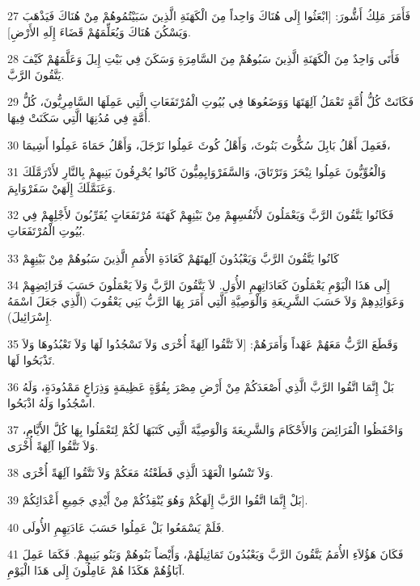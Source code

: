 \par 27 فَأَمَرَ مَلِكُ أَشُّورَ: [ابْعَثُوا إِلَى هُنَاكَ وَاحِداً مِنَ الْكَهَنَةِ الَّذِينَ سَبَيْتُمُوهُمْ مِنْ هُنَاكَ فَيَذْهَبَ وَيَسْكُنَ هُنَاكَ وَيُعَلِّمَهُمْ قَضَاءَ إِلَهِ الأَرْضِ].
\par 28 فَأَتَى وَاحِدٌ مِنَ الْكَهَنَةِ الَّذِينَ سَبُوهُمْ مِنَ السَّامِرَةِ وَسَكَنَ فِي بَيْتِ إِيلَ وَعَلَّمَهُمْ كَيْفَ يَتَّقُونَ الرَّبَّ.
\par 29 فَكَانَتْ كُلُّ أُمَّةٍ تَعْمَلُ آلِهَتَهَا وَوَضَعُوهَا فِي بُيُوتِ الْمُرْتَفَعَاتِ الَّتِي عَمِلَهَا السَّامِرِيُّونَ، كُلُّ أُمَّةٍ فِي مُدُنِهَا الَّتِي سَكَنَتْ فِيهَا.
\par 30 فَعَمِلَ أَهْلُ بَابِلَ سُكُّوتَ بَنُوثَ، وَأَهْلُ كُوثَ عَمِلُوا نَرْجَلَ، وَأَهْلُ حَمَاةَ عَمِلُوا أَشِيمَا،
\par 31 وَالْعُوِّيُّونَ عَمِلُوا نِبْحَزَ وَتَرْتَاقَ، وَالسَّفَرْوَايِمِيُّونَ كَانُوا يُحْرِقُونَ بَنِيهِمْ بِالنَّارِ لأَدْرَمَّلَكَ وَعَنَمَّلَكَ إِلَهَيْ سَفَرْوَايِمَ.
\par 32 فَكَانُوا يَتَّقُونَ الرَّبَّ وَيَعْمَلُونَ لأَنْفُسِهِمْ مِنْ بَيْنِهِمْ كَهَنَةَ مُرْتَفَعَاتٍ يُقَرِّبُونَ لأَجْلِهِمْ فِي بُيُوتِ الْمُرْتَفَعَاتِ.
\par 33 كَانُوا يَتَّقُونَ الرَّبَّ وَيَعْبُدُونَ آلِهتَهُمْ كَعَادَةِ الأُمَمِ الَّذِينَ سَبُوهُمْ مِنْ بَيْنِهِمْ
\par 34 إِلَى هَذَا الْيَوْمِ يَعْمَلُونَ كَعَادَاتِهِمِ الأُوَلِ. لاَ يَتَّقُونَ الرَّبَّ وَلاَ يَعْمَلُونَ حَسَبَ فَرَائِضِهِمْ وَعَوَائِدِهِمْ وَلاَ حَسَبَ الشَّرِيعَةِ وَالْوَصِيَّةِ الَّتِي أَمَرَ بِهَا الرَّبُّ بَنِي يَعْقُوبَ (الَّذِي جَعَلَ اسْمَهُ إِسْرَائِيلَ).
\par 35 وَقَطَعَ الرَّبُّ مَعَهُمْ عَهْداً وَأَمَرَهُمْ: [لاَ تَتَّقُوا آلِهَةً أُخْرَى وَلاَ تَسْجُدُوا لَهَا وَلاَ تَعْبُدُوهَا وَلاَ تَذْبَحُوا لَهَا.
\par 36 بَلْ إِنَّمَا اتَّقُوا الرَّبَّ الَّذِي أَصْعَدَكُمْ مِنْ أَرْضِ مِصْرَ بِقُوَّةٍ عَظِيمَةٍ وَذِرَاعٍ مَمْدُودَةٍ، وَلَهُ اسْجُدُوا وَلَهُ اذْبَحُوا.
\par 37 وَاحْفَظُوا الْفَرَائِضَ وَالأَحْكَامَ وَالشَّرِيعَةَ وَالْوَصِيَّةَ الَّتِي كَتَبَهَا لَكُمْ لِتَعْمَلُوا بِهَا كُلَّ الأَيَّامِ، وَلاَ تَتَّقُوا آلِهَةً أُخْرَى.
\par 38 وَلاَ تَنْسُوا الْعَهْدَ الَّذِي قَطَعْتُهُ مَعَكُمْ وَلاَ تَتَّقُوا آلِهَةً أُخْرَى.
\par 39 بَلْ إِنَّمَا اتَّقُوا الرَّبَّ إِلَهَكُمْ وَهُوَ يُنْقِذُكُمْ مِنْ أَيْدِي جَمِيعِ أَعْدَائِكُمْ].
\par 40 فَلَمْ يَسْمَعُوا بَلْ عَمِلُوا حَسَبَ عَادَتِهِمِ الأُولَى.
\par 41 فَكَانَ هَؤُلاَءِ الأُمَمُ يَتَّقُونَ الرَّبَّ وَيَعْبُدُونَ تَمَاثِيلَهُمْ، وَأَيْضاً بَنُوهُمْ وَبَنُو بَنِيهِمْ. فَكَمَا عَمِلَ آبَاؤُهُمْ هَكَذَا هُمْ عَامِلُونَ إِلَى هَذَا الْيَوْمِ.

